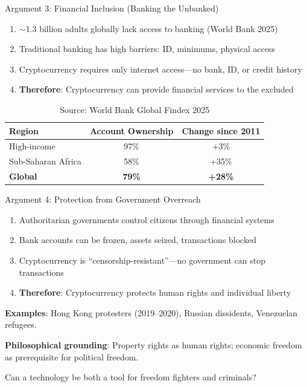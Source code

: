 ﻿\documentclass[aspectratio=169,11pt]{beamer}
\begin{document}
\begin{frame}{Argument 3: Financial Inclusion (Banking the Unbanked)}
\begin{probox}
\small
\begin{enumerate}
    \item $\sim$1.3 billion adults globally lack access to banking (World Bank 2025)
    \item Traditional banking has high barriers: ID, minimums, physical access
    \item Cryptocurrency requires only internet access---no bank, ID, or credit history
    \item \textbf{Therefore}: Cryptocurrency can provide financial services to the excluded
\end{enumerate}
\end{probox}

\vspace{-0.3em}
\begin{table}[h]
\centering
\scriptsize
\begin{tabular}{@{}lcc@{}}
\toprule
\textbf{Region} & \textbf{Account Ownership} & \textbf{Change since 2011} \\
\midrule
High-income & 97\% & +3\% \\
Sub-Saharan Africa & 58\% & +35\% \\
\textbf{Global} & \textbf{79\%} & \textbf{+28\%} \\
\bottomrule
\end{tabular}
\caption{\scriptsize Source: World Bank Global Findex 2025}
\end{table}
\end{frame}

\begin{frame}{Argument 4: Protection from Government Overreach}
\begin{probox}
\small
\begin{enumerate}
    \item Authoritarian governments control citizens through financial systems
    \item Bank accounts can be frozen, assets seized, transactions blocked
    \item Cryptocurrency is ``censorship-resistant''---no government can stop transactions
    \item \textbf{Therefore}: Cryptocurrency protects human rights and individual liberty
\end{enumerate}
\end{probox}

\vspace{0.2em}
\textbf{Examples}: Hong Kong protesters (2019--2020), Russian dissidents, Venezuelan refugees.

\textbf{Philosophical grounding}: Property rights as human rights; economic freedom as prerequisite for political freedom.

\begin{discussionbox}[Discussion]
Can a technology be both a tool for freedom fighters and criminals?
\end{discussionbox}
\end{frame}
\end{document}
